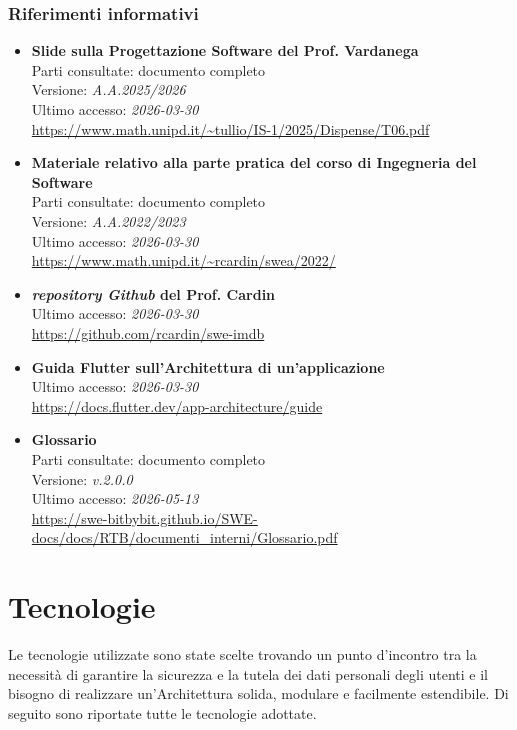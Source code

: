 \documentclass[a4paper,12pt]{article}
\newcommand{\ignoreglossary}{}
\begin{document}
\subsubsection{Riferimenti informativi} \label{sec:riferimenti_informativi}
\begin{itemize}
    \item \textbf{Slide sulla Progettazione Software del Prof. Vardanega}\\
        Parti consultate: documento completo\\
        Versione: \textit{A.A.2025/2026}\\
        Ultimo accesso: \textit{2026-03-30}\\
        \url{https://www.math.unipd.it/~tullio/IS-1/2025/Dispense/T06.pdf}
    \item \textbf{Materiale relativo alla parte pratica del corso di Ingegneria del Software}\\
        Parti consultate: documento completo\\
        Versione: \textit{A.A.2022/2023}\\
        Ultimo accesso: \textit{2026-03-30}\\
        \url{https://www.math.unipd.it/~rcardin/swea/2022/}
    \item \textbf{\emph{\ignoreglossary{repository} Github} del Prof. Cardin}\\
        Ultimo accesso: \textit{2026-03-30}\\
        \url{https://github.com/rcardin/swe-imdb}
    \item \textbf{Guida Flutter sull'Architettura di un'applicazione}\\
        Ultimo accesso: \textit{2026-03-30}\\
        \url{https://docs.flutter.dev/app-architecture/guide} 
    \item \textbf{Glossario}\\
        Parti consultate: documento completo\\
        Versione: \textit{v.2.0.0}\\
        Ultimo accesso: \textit{2026-05-13}\\
        \url{https://swe-bitbybit.github.io/SWE-docs/docs/RTB/documenti_interni/Glossario.pdf}
\end{itemize}

\section{Tecnologie} \label{sec:tecnologie}
Le tecnologie utilizzate sono state scelte trovando un punto d'incontro tra la necessità di garantire la sicurezza e la tutela dei dati personali degli utenti e il bisogno di realizzare un'Architettura solida, modulare e facilmente estendibile. Di seguito sono riportate tutte le tecnologie adottate.
\end{document}
